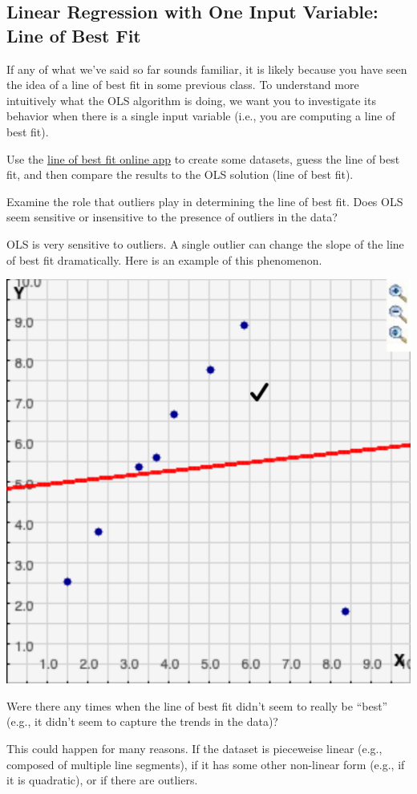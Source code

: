\documentclass[assignment01_Solutions]{subfiles}
\begin{document}
\subsection{Linear Regression with One Input Variable: Line of Best Fit}
If any of what we've said so far sounds familiar, it is likely because you have seen the idea of a line of best fit in some previous class.  To understand more intuitively what the OLS algorithm is doing, we want you to investigate its behavior when there is a single input variable (i.e., you are computing a line of best fit).  

\begin{externalresources}
Use the \href{http://www.shodor.org/interactivate/activities/Regression/}{line of best fit online app} to create some datasets, guess the line of best fit, and then compare the results to the OLS solution (line of best fit).

\begin{exercise}
\bes
\item Examine the role that outliers play in determining the line of best fit.  Does OLS seem sensitive or insensitive to the presence of outliers in the data?
\begin{boxedsolution}
OLS is very sensitive to outliers.  A single outlier can change the slope of the line of best fit dramatically.  Here is an example of this phenomenon.

\begin{center}
\includegraphics[width=.6\linewidth]{figures/outlier}
\end{center}

\end{boxedsolution}

\item Were there any times when the line of best fit didn't seem to really be ``best'' (e.g., it didn't seem to capture the trends in the data)?
\begin{boxedsolution}
This could happen for many reasons.  If the dataset is pieceweise linear (e.g., composed of multiple line segments), if it has some other non-linear form (e.g., if it is quadratic), or if there are outliers.
\end{boxedsolution}

\ees
\end{exercise}

\end{externalresources}
\end{document}
